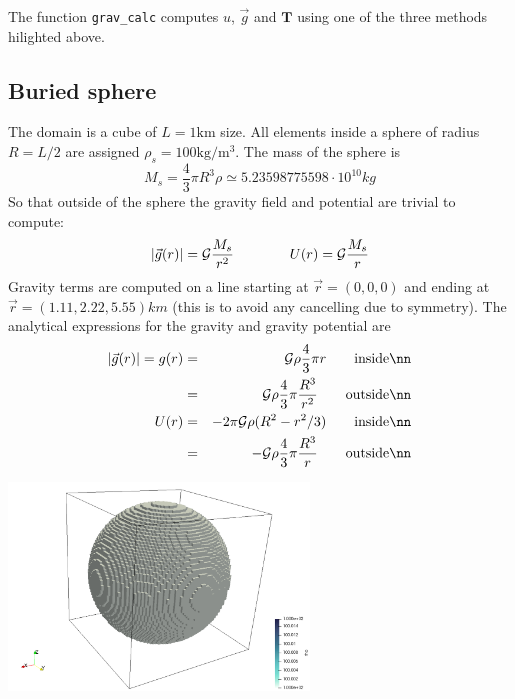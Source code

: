 The function {\tt grav\_calc} computes $u$, $\vec{g}$ and ${\bm T}$ using one of the three methods hilighted above. 






\newpage
\subsection*{Buried sphere}

The domain is a cube of $L=1\si{\km}$ size. All elements inside a sphere of radius $R=L/2$ are assigned
$\rho_s=100\si{\kg\per\cubic\metre}$.
The mass of the sphere is 
\[
M_s = \frac{4}{3}\pi R^3 \rho \simeq 5.23598775598 \cdot 10^{10} \si{kg}
\]
So that outside of the sphere the gravity field and potential are trivial to compute:
\[
|\vec{g}(r)|={\cal G}\frac{M_s}{r^2}
\qquad
\qquad
U(r)={\cal G}\frac{M_s}{r}
\]
Gravity terms are computed on a line starting at $\vec{r}=(0,0,0)$ and ending at $\vec{r}=(1.11,2.22,5.55)\si{km}$ (this is to avoid any cancelling due to symmetry).
The analytical expressions for the gravity and gravity potential are 
\begin{eqnarray}
|\vec{g}(r)|=g(r) 
&=& {\cal G} \rho \frac{4}{3}\pi r \qquad \text{inside} \nn\\
&=& {\cal G} \rho \frac{4}{3}\pi \frac{R^3}{r^2}  \qquad \text{outside} \nn\\
U(r) 
&=& - 2 \pi {\cal G} \rho (R^2-r^2/3) \qquad \text{inside} \nn\\
&=& - {\cal G} \rho \frac{4}{3}\pi \frac{R^3}{r}  \qquad \text{outside} \nn
\end{eqnarray}

\begin{center}
\includegraphics[width=8cm]{python_codes/fieldstone_84/sphere/setup}
\end{center}


